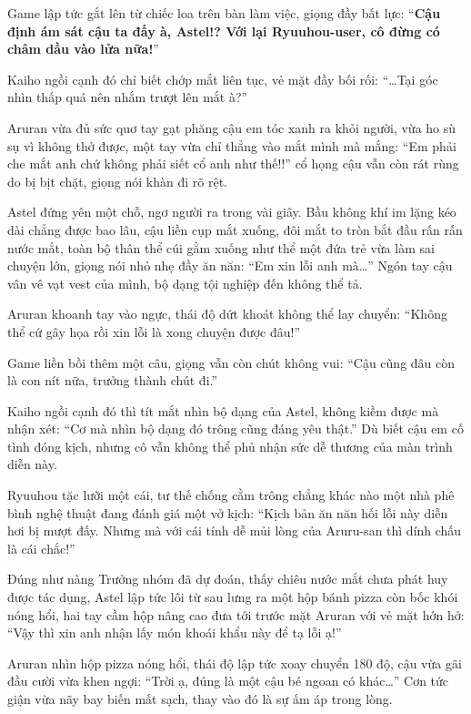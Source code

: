 \documentclass[../main.tex]{subfiles}
\begin{document}
Game lập tức gắt lên từ chiếc loa trên bàn làm việc, giọng đầy bất lực: ``\textbf{Cậu định ám sát cậu ta đấy à, Astel!? Với lại Ryuuhou-user, cô đừng có châm dầu vào lửa nữa!}''

Kaiho ngồi cạnh đó chỉ biết chớp mắt liên tục, vẻ mặt đầy bối rối: ``\dots Tại góc nhìn thấp quá nên nhắm trượt lên mắt à?''

Aruran vừa đủ sức quơ tay gạt phăng cậu em tóc xanh ra khỏi người, vừa ho sù sụ vì không thở được, một tay vừa chỉ thẳng vào mắt mình mà mắng: ``Em phải che mắt anh chứ không phải siết cổ anh như thế!!'' cổ họng cậu vẫn còn rát rùng do bị bịt chặt, giọng nói khàn đi rõ rệt.

Astel đứng yên một chỗ, ngơ người ra trong vài giây. Bầu không khí im lặng kéo dài chẳng được bao lâu, cậu liền cụp mắt xuống, đôi mắt to tròn bắt đầu rấn rấn nước mắt, toàn bộ thân thể cúi gằm xuống như thể một đứa trẻ vừa làm sai chuyện lớn, giọng nói nhỏ nhẹ đầy ăn năn: ``Em xin lỗi anh mà\dots'' Ngón tay cậu vân vê vạt vest của mình, bộ dạng tội nghiệp đến không thể tả.


Aruran khoanh tay vào ngực, thái độ dứt khoát không thể lay chuyển: ``Không thể cứ gây họa rồi xin lỗi là xong chuyện được đâu!''

Game liền bồi thêm một câu, giọng vẫn còn chút không vui: ``Cậu cũng đâu còn là con nít nữa, trưởng thành chút đi.''

Kaiho ngồi cạnh đó thì tít mắt nhìn bộ dạng của Astel, không kiềm được mà nhận xét: ``Cơ mà nhìn bộ dạng đó trông cũng đáng yêu thật.'' Dù biết cậu em cố tình đóng kịch, nhưng cô vẫn không thể phủ nhận sức dễ thương của màn trình diễn này.

Ryuuhou tặc lưỡi một cái, tư thế chống cằm trông chẳng khác nào một nhà phê bình nghệ thuật đang đánh giá một vở kịch: ``Kịch bản ăn năn hối lỗi này diễn hơi bị mượt đấy. Nhưng mà với cái tính dễ mủi lòng của Aruru-san thì dính chấu là cái chắc!''

Đúng như nàng Trưởng nhóm đã dự đoán, thấy chiêu nước mắt chưa phát huy được tác dụng, Astel lập tức lôi từ sau lưng ra một hộp bánh pizza còn bốc khói nóng hổi, hai tay cầm hộp nâng cao đưa tới trước mặt Aruran với vẻ mặt hớn hở: ``Vậy thì xin anh nhận lấy món khoái khẩu này để tạ lỗi ạ!''

Aruran nhìn hộp pizza nóng hổi, thái độ lập tức xoay chuyển 180 độ, cậu vừa gãi đầu cười vừa khen ngợi: ``Trời ạ, đúng là một cậu bé ngoan có khác\dots'' Cơn tức giận vừa nãy bay biến mất sạch, thay vào đó là sự ấm áp trong lòng.
\end{document}
